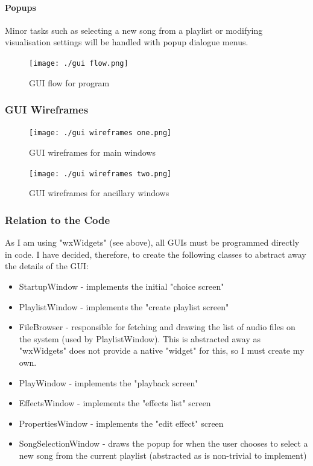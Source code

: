 \paragraph{Popups}
Minor tasks such as  selecting a new song from a playlist or modifying visualisation settings will be handled with popup dialogue menus.

\begin{figure}[H]
	\texttt{[image: ./gui flow.png]}
	\caption{GUI flow for program }
\end{figure}

\subsubsection{GUI Wireframes}

\begin{figure}[H]
	\texttt{[image: ./gui wireframes one.png]}
	\caption{GUI wireframes for main windows }
\end{figure}

\begin{figure}[H]
	\texttt{[image: ./gui wireframes two.png]}
	\caption{GUI wireframes for ancillary windows }
\end{figure}

\subsubsection{Relation to the Code}
As I am using "wxWidgets" (see above), all GUIs must be programmed directly in code. I have decided, therefore, to create the following classes to abstract away the details of the GUI:
\begin{itemize}
	\item StartupWindow - implements the initial "choice screen"
	\item PlaylistWindow - implements the "create playlist screen"
	\item FileBrowser - responsible for fetching and drawing the  list of audio files on the system (used by PlaylistWindow). This is abstracted away as "wxWidgets" does not provide a native "widget" for this, so I must create my own.
	\item PlayWindow - implements the "playback screen"
	\item EffectsWindow - implements the "effects list" screen
	\item PropertiesWindow - implements the "edit effect" screen
	\item SongSelectionWindow - draws the popup for when the user chooses to select a new song from the current playlist (abstracted as is non-trivial to implement)
\end{itemize}

